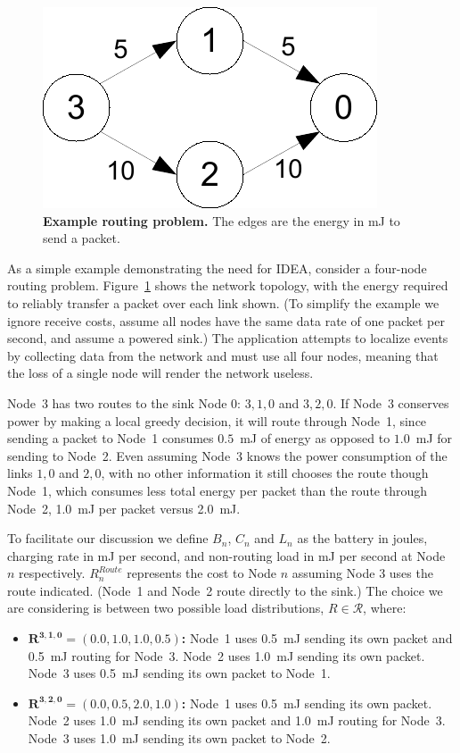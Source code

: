 \begin{figure}[t]
\begin{center}
\includegraphics[width=0.6\hsize]{./5-idea/figs/motivationexample.pdf}
\end{center}
\caption{\textbf{Example routing problem.} The edges are the energy in mJ to
send a packet.}
\label{idea-fig-motivationexample}
\end{figure}

As a simple example demonstrating the need for IDEA, consider a four-node
routing problem. Figure~\ref{idea-fig-motivationexample} shows the network
topology, with the energy required to reliably transfer a packet over each
link shown. (To simplify the example we ignore receive costs, assume all
nodes have the same data rate of one packet per second, and assume a powered
sink.) The application attempts to localize events by collecting data from
the network and must use all four nodes, meaning that the loss of a single
node will render the network useless.

Node~3 has two routes to the sink Node 0: $3,1,0$ and $3,2,0$. If Node~3
conserves power by making a local greedy decision, it will route through
Node~1, since sending a packet to Node~1 consumes $0.5$~mJ of energy as
opposed to $1.0$~mJ for sending to Node~2. Even assuming Node~3 knows the
power consumption of the links $1,0$ and $2,0$, with no other information it
still chooses the route though Node~1, which consumes less total energy per
packet than the route through Node~2, 1.0~mJ per packet versus 2.0~mJ.

To facilitate our discussion we define $B_n$, $C_n$ and $L_n$ as the
battery in joules, charging rate in mJ per second, and non-routing load in mJ
per second at Node $n$ respectively.  $R^{Route}_n$ represents the cost to
Node $n$ assuming Node 3 uses the route indicated.  (Node~1 and Node~2 route
directly to the sink.) The choice we are considering is between two possible
load distributions, $R \in \mathcal{R}$, where:

\begin{itemize}

\item \textbf{$\mathbf{R^{3,1,0} = (0.0, 1.0, 1.0, 0.5)}$:} Node~1 uses 0.5~mJ sending
its own packet and 0.5~mJ routing for Node~3. Node~2 uses 1.0~mJ sending its
own packet. Node~3 uses 0.5~mJ sending its own packet to Node~1.

\item \textbf{$\mathbf{R^{3,2,0} = (0.0, 0.5, 2.0, 1.0)}$:} Node~1 uses 0.5~mJ
sending its own packet. Node~2 uses 1.0~mJ sending its own packet and 1.0~mJ
routing for Node~3. Node~3 uses 1.0~mJ sending its own packet to Node~2.

\end{itemize}

